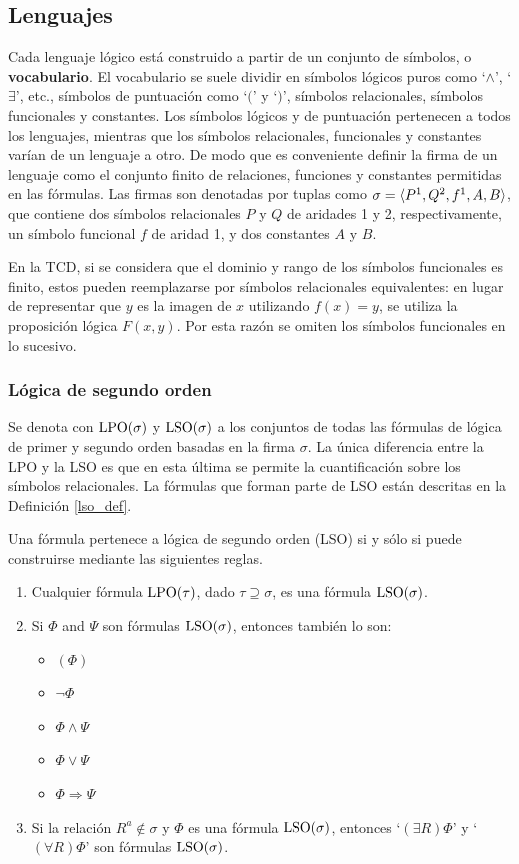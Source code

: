 \subsection{Lenguajes}
Cada lenguaje lógico está construido a partir de un conjunto de símbolos, o
\textbf{vocabulario}.
El vocabulario se suele dividir en símbolos lógicos puros como `$\land$',
`$\exists$', etc., símbolos de puntuación como `$($' y `$)$', símbolos
relacionales, símbolos funcionales y constantes. Los símbolos lógicos y de
puntuación pertenecen a todos los lenguajes, mientras que los símbolos
relacionales, funcionales y constantes varían de un lenguaje a otro. De modo
que es conveniente definir la firma de un lenguaje como el conjunto finito de
relaciones, funciones y constantes permitidas en las fórmulas. Las firmas son
denotadas por tuplas como $\sigma=\langle P^1,Q^2,f^1,A,B \rangle$, que contiene dos
símbolos relacionales $P$ y $Q$ de aridades 1 y 2, respectivamente, un símbolo
funcional $f$ de aridad 1, y dos constantes $A$ y $B$.

En la TCD, si se considera que el dominio y rango de los símbolos funcionales
es finito, estos pueden reemplazarse por símbolos relacionales
equivalentes: en lugar de representar que $y$ es la imagen de $x$ utilizando
$f(x) = y$, se utiliza la proposición lógica $F(x, y)$.
Por esta razón se omiten los símbolos funcionales en lo sucesivo.

\subsubsection{Lógica de segundo orden}
Se denota con $\text{LPO}(\sigma)$ y $\text{LSO}(\sigma)$ a los conjuntos de todas las
fórmulas de lógica de primer y segundo orden basadas en la firma $\sigma$.
La única diferencia entre la LPO y la LSO es que en esta última se permite la
cuantificación sobre los símbolos relacionales. La fórmulas que forman parte
de LSO están descritas en la Definición \ref{lso_def}.

\begin{definition} Una fórmula pertenece a lógica de segundo orden (LSO) si y
sólo si puede construirse mediante las siguientes reglas.
\label{lso_def}
\begin{enumerate}
\item Cualquier fórmula $\text{LPO}(\tau)$, dado $\tau\supseteq\sigma$, es una
fórmula $\text{LSO}(\sigma)$.
\item Si $\Phi$ and $\Psi$ son fórmulas $\text{LSO}(\sigma)$, entonces también lo
son:
 \begin{itemize}
    \item $(\Phi)$
    \item $\neg\Phi$
    \item $\Phi\land\Psi$
    \item $\Phi\lor\Psi$
    \item $\Phi\Rightarrow\Psi$
  \end{itemize}
\item Si la relación $R^a\notin\sigma$ y $\Phi$ es una fórmula $\text{LSO}(\sigma)$,
  entonces `$(\exists R)\Phi$' y `$(\forall R)\Phi$' son fórmulas $\text{LSO}(\sigma)$.
\end{enumerate}
\end{definition}

